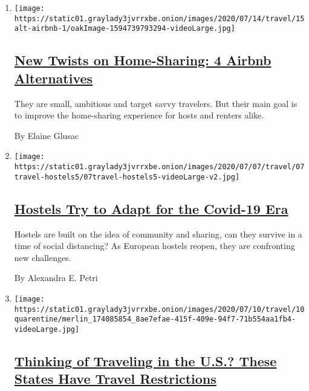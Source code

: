 \begin{enumerate}
\def\labelenumi{\arabic{enumi}.}
\item
  \texttt{[image: https://static01.graylady3jvrrxbe.onion/images/2020/07/14/travel/15alt-airbnb-1/oakImage-1594739793294-videoLarge.jpg]}

  \hypertarget{new-twists-on-home-sharing-4-airbnb-alternatives}{%
  \subsection{\texorpdfstring{\href{/2020/07/15/travel/airbnb-alternatives-home-sharing.html}{New
  Twists on Home-Sharing: 4 Airbnb
  Alternatives}}{New Twists on Home-Sharing: 4 Airbnb Alternatives}}\label{new-twists-on-home-sharing-4-airbnb-alternatives}}

  They are small, ambitious and target savvy travelers. But their main
  goal is to improve the home-sharing experience for hosts and renters
  alike.

  By Elaine Glusac
\item
  \texttt{[image: https://static01.graylady3jvrrxbe.onion/images/2020/07/07/travel/07travel-hostels5/07travel-hostels5-videoLarge-v2.jpg]}

  \hypertarget{hostels-try-to-adapt-for-the-covid-19-era}{%
  \subsection{\texorpdfstring{\href{/2020/07/07/travel/virus-hostels-backpacking.html}{Hostels
  Try to Adapt for the Covid-19
  Era}}{Hostels Try to Adapt for the Covid-19 Era}}\label{hostels-try-to-adapt-for-the-covid-19-era}}

  Hostels are built on the idea of community and sharing, can they
  survive in a time of social distancing? As European hostels reopen,
  they are confronting new challenges.

  By Alexandra E. Petri
\item
  \texttt{[image: https://static01.graylady3jvrrxbe.onion/images/2020/07/10/travel/10quarentine/merlin\_174085854\_8ae7efae-415f-409e-94f7-71b554aa1fb4-videoLarge.jpg]}

  \hypertarget{thinking-of-traveling-in-the-us-these-states-have-travel-restrictions}{%
  \subsection{\texorpdfstring{\href{/2020/07/10/travel/state-travel-restrictions.html}{Thinking
  of Traveling in the U.S.? These States Have Travel
  Restrictions}}{Thinking of Traveling in the U.S.? These States Have Travel Restrictions}}\label{thinking-of-traveling-in-the-us-these-states-have-travel-restrictions}}


\end{enumerate}
